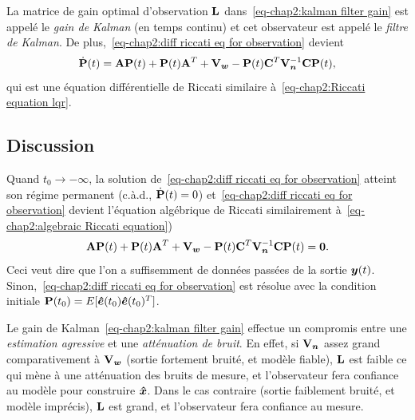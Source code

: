 La matrice de gain optimal d'observation  $\mathbf{L}$ dans~\eqref{eq-chap2:kalman filter gain} est appelé le \emph{gain de Kalman} (en temps continu) et cet observateur est appelé le \emph{filtre de Kalman}. De plus,~\eqref{eq-chap2:diff riccati eq for observation} devient 
\begin{equation}
	\dot{\mathbf{P}}(t) = \mathbf{A}\mathbf{P}(t) + \mathbf{P}(t)\mathbf{A}^T+\mathbf{V}_{\bm w}-\mathbf{P}(t)\mathbf{C}^T\mathbf{V}_{\bm n}^{-1}\mathbf{C}\mathbf{P}(t),
\end{equation}
qui est une équation différentielle de Riccati similaire à~\eqref{eq-chap2:Riccati equation lqr}. 
\subsection{Discussion}
Quand $t_0\rightarrow-\infty$, la solution de~\eqref{eq-chap2:diff riccati eq for observation} atteint son régime permanent (c.à.d., $\dot{\mathbf{P}}(t)=0$) et~\eqref{eq-chap2:diff riccati eq for observation} devient l'équation algébrique de Riccati similairement à~\eqref{eq-chap2:algebraic Riccati equation})  
\begin{equation}\label{eq-chap2:algebric Riccati equation observation}
\mathbf{A}\mathbf{P}(t) + \mathbf{P}(t)\mathbf{A}^T+\mathbf{V}_{\bm w}-\mathbf{P}(t)\mathbf{C}^T\mathbf{V}_{\bm n}^{-1}\mathbf{C}\mathbf{P}(t)=\mathbf{0}.
\end{equation}
Ceci veut dire que l'on a suffisemment de données passées de la sortie $\bm{y}(t)$. Sinon,~\eqref{eq-chap2:diff riccati eq for observation} est résolue avec la condition initiale $\mathbf{P}(t_0)=E[\bm{\hat{e}}(t_0)\bm{\hat{e}}(t_0)^T]$.

Le gain de Kalman~\eqref{eq-chap2:kalman filter gain} effectue un compromis entre une \emph{estimation agressive} et une \emph{atténuation de bruit}. En effet, si $\mathbf{V}_{\bm n}$ assez grand comparativement à $\mathbf{V}_{\bm w}$ (sortie fortement bruité, et modèle fiable), $\mathbf{L}$ est faible ce qui mène à une atténuation des bruits de mesure, et l'observateur fera confiance au modèle pour construire $\bm{\hat{x}}$. Dans le cas contraire (sortie faiblement bruité, et modèle imprécis),  $\mathbf{L}$ est grand, et l'observateur fera confiance au mesure.

